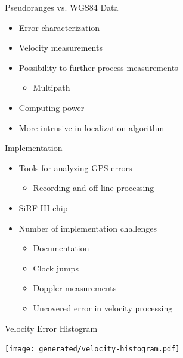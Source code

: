 \documentclass[utf8,12pt]{beamer}
\begin{document}
\begin{frame}{Pseudoranges vs. WGS84 Data}
    \begin{itemize}
        \item Error characterization
        \item Velocity measurements
        \item Possibility to further process measurements
        \begin{itemize}
            \item Multipath

        \end{itemize}
    \end{itemize}

    \begin{itemize}
        \item Computing power
        \item More intrusive in localization algorithm
    \end{itemize}
\end{frame}

\begin{frame}{Implementation}
    \begin{itemize}
        \item Tools for analyzing GPS errors
        \begin{itemize}
            \item Recording and off-line processing
        \end{itemize}
        \item SiRF III chip
        \item Number of implementation challenges
        \begin{itemize}
            \item Documentation
            \item Clock jumps
            \item Doppler measurements
            \item Uncovered error in velocity processing
        \end{itemize}
    \end{itemize}
\end{frame}

\begin{frame}[plain]{Velocity Error Histogram}
\begin{center}
\centerline{\texttt{[image: generated/velocity-histogram.pdf]}}
\end{center}
\end{frame}
\end{document}
